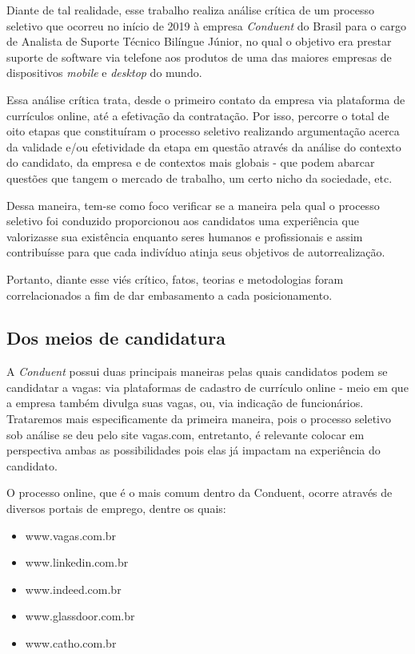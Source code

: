 \documentclass[12pt]{article}
\begin{document}
Diante de tal realidade, esse trabalho realiza análise crítica de um processo seletivo que ocorreu no início de 2019 à empresa \emph{Conduent} do Brasil para o cargo de Analista de Suporte Técnico Bilíngue Júnior, no qual o objetivo era prestar suporte de software via telefone aos produtos de uma das maiores empresas de dispositivos \emph{mobile} e \emph{desktop} do mundo.

Essa análise crítica trata, desde o primeiro contato da empresa via plataforma de currículos online, até a efetivação da contratação. Por isso, percorre o total de oito etapas que constituíram o processo seletivo realizando argumentação acerca da validade e/ou efetividade da etapa em questão através da análise do contexto do candidato, da empresa e de contextos mais globais - que podem abarcar questões que tangem o mercado de trabalho, um certo nicho da sociedade, etc.

Dessa maneira, tem-se como foco verificar se a maneira pela qual o processo seletivo foi conduzido proporcionou aos candidatos uma experiência que valorizasse sua existência enquanto seres humanos e profissionais e assim contribuísse para que cada indivíduo atinja seus objetivos de autorrealização. 

Portanto, diante esse viés crítico, fatos, teorias e metodologias foram correlacionados a fim de dar embasamento a cada posicionamento.

\newpage



\subsection {Dos meios de candidatura}

A \emph {Conduent} possui duas principais maneiras pelas quais candidatos podem se candidatar a vagas: via plataformas de cadastro de currículo online - meio em que a empresa também divulga suas vagas, ou, via indicação de funcionários. Trataremos mais especificamente da primeira maneira, pois o processo seletivo sob análise se deu pelo site vagas.com, entretanto, é relevante colocar em perspectiva ambas as possibilidades pois elas já impactam na experiência do candidato. 

O processo online, que é o mais comum dentro da Conduent, ocorre através de diversos portais de emprego, dentre os quais:

\begin{itemize}
\item www.vagas.com.br
\item www.linkedin.com.br
\item www.indeed.com.br
\item www.glassdoor.com.br
\item www.catho.com.br
\end{itemize} 
\end{document}
